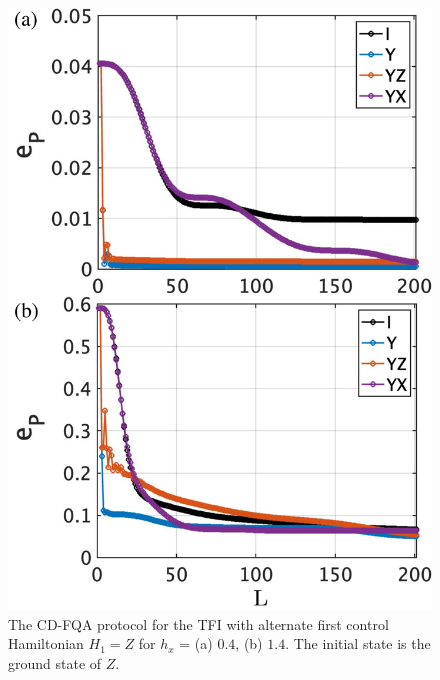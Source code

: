 \documentclass[twocolumn,aps,superscriptaddress,floatfix,longbibliography]{revtex4-2}
\begin{document}
\begin{figure}[b!]
    \centering
    \includegraphics[width=0.85\linewidth]{zadd.pdf} %
    \caption{The CD-FQA protocol for the TFI with alternate first control Hamiltonian $H_1=Z$ %
    for $h_x$ = (a) $0.4$, (b) $1.4$. The initial state is the ground state of $Z$.}
    \label{fig:TFIwithZ}
\end{figure}
\end{document}
